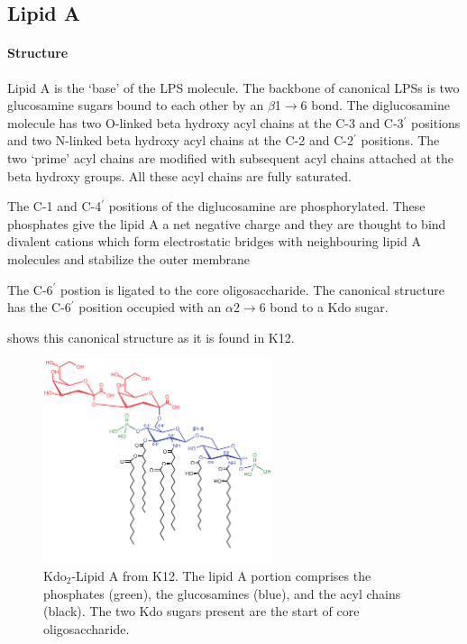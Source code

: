   \subsection{Lipid A}\label{sec:lipidA-intro}
  
    \paragraph{Structure}
    
    Lipid A is the `base' of the \ac{LPS} molecule. The backbone of canonical \acp{LPS} is two glucosamine sugars bound to each other by an $\beta$1$\rightarrow$6 bond. The diglucosamine molecule has two O-linked beta hydroxy acyl chains at the C-3 and C-3$^\prime$ positions and two N-linked beta hydroxy acyl chains at the C-2 and C-2$^\prime$ positions. The two `prime' acyl chains are modified with subsequent acyl chains attached at the beta hydroxy groups. All these acyl chains are fully saturated.
    
    The C-1 and C-4$^\prime$ positions of the diglucosamine are phosphorylated. These phosphates give the lipid A a net negative charge and they are thought to bind divalent cations which form electrostatic bridges with neighbouring lipid A molecules and stabilize the outer membrane

    The C-6$^\prime$ postion is ligated to the core oligosaccharide. The canonical structure has the C-6$^\prime$ position occupied with an $\alpha$2$\rightarrow$6 bond to a Kdo sugar.

     shows this canonical structure as it is found in \ecoli K12.

\begin{figure}[htb]
  	\begin{center}
   		\includegraphics[width=0.6\textwidth]{intro/img/lipidA.pdf}
   	\end{center}
   	\caption[Kdo$_{2}$-Lipid A from \ecoli K12]{ 
Kdo$_{2}$-Lipid A from \ecoli K12. The lipid A portion comprises the phosphates (green), the glucosamines (blue), and the acyl chains (black). The two Kdo sugars present are the start of core oligosaccharide.
}
\label{fig:lipidA}
\end{figure}   

